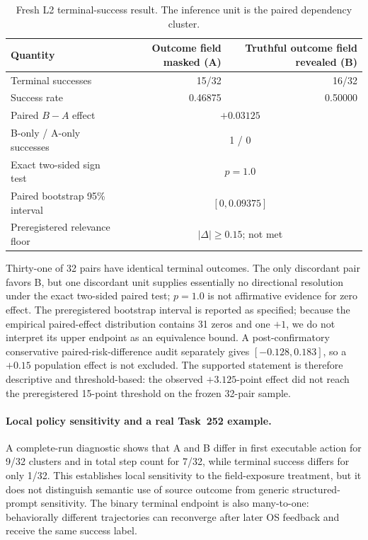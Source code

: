 \begin{table}[t]
\centering
\caption{Fresh L2 terminal-success result. The inference unit is the paired dependency cluster.}
\label{tab:l2fresh}
\small
\begin{tabular}{lrr}
\toprule
Quantity & Outcome field masked (A) & Truthful outcome field revealed (B) \\
\midrule
Terminal successes & 15/32 & 16/32 \\
Success rate & 0.46875 & 0.50000 \\
\midrule
Paired $B-A$ effect & \multicolumn{2}{c}{$+0.03125$} \\
B-only / A-only successes & \multicolumn{2}{c}{1 / 0} \\
Exact two-sided sign test & \multicolumn{2}{c}{$p=1.0$} \\
Paired bootstrap 95\% interval & \multicolumn{2}{c}{$[0,0.09375]$} \\
Preregistered relevance floor & \multicolumn{2}{c}{$|\Delta|\geq0.15$; not met} \\
\bottomrule
\end{tabular}
\end{table}

Thirty-one of 32 pairs have identical terminal outcomes. The only discordant pair favors B, but one discordant unit supplies essentially no directional resolution under the exact two-sided paired test; $p=1.0$ is not affirmative evidence for zero effect. The preregistered bootstrap interval is reported as specified; because the empirical paired-effect distribution contains 31 zeros and one $+1$, we do not interpret its upper endpoint as an equivalence bound. A post-confirmatory conservative paired-risk-difference audit separately gives $[-0.128,0.183]$, so a $+0.15$ population effect is not excluded. The supported statement is therefore descriptive and threshold-based: the observed $+3.125$-point effect did not reach the preregistered 15-point threshold on the frozen 32-pair sample.

\paragraph{Local policy sensitivity and a real Task~252 example.}
A complete-run diagnostic shows that A and B differ in first executable action for 9/32 clusters and in total step count for 7/32, while terminal success differs for only 1/32. This establishes local sensitivity to the field-exposure treatment, but it does not distinguish semantic use of source outcome from generic structured-prompt sensitivity. The binary terminal endpoint is also many-to-one: behaviorally different trajectories can reconverge after later OS feedback and receive the same success label.

